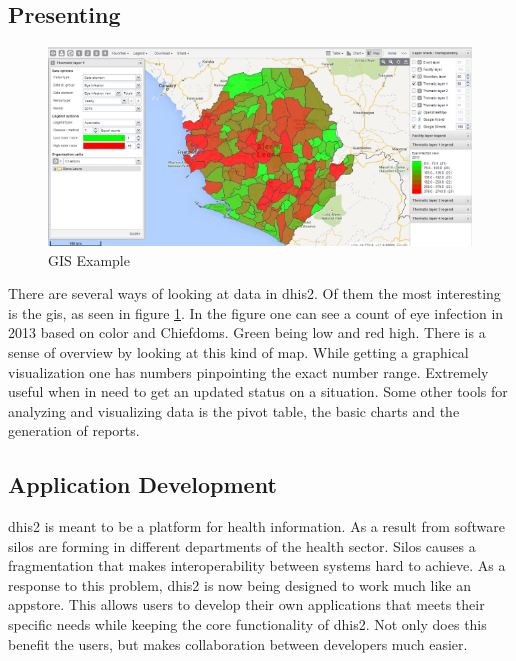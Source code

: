 \subsection{Presenting}
\begin{figure}
\centering
\includegraphics[width=\columnwidth]{context/img/gisExample}
\caption{GIS Example}
\label{fig:gis}
\end{figure}
There are several ways of looking at data in \gls{dhis2}. 
Of them the most interesting is the \gls{gis}, as seen in figure \ref{fig:gis}. 
In the figure one can see a count of eye infection in 2013 based on color and Chiefdoms. 
Green being low and red high. 
There is a sense of overview by looking at this kind of map. 
While getting a graphical visualization one has numbers pinpointing the exact number range. 
Extremely useful when in need to get an updated status on a situation. 
Some other tools for analyzing and visualizing data is the pivot table, the basic charts and the generation of reports.

\subsection{Application Development}
\gls{dhis2} is meant to be a platform for health information. 
As a result from software silos are forming in different departments of the health sector. 
Silos causes a fragmentation that makes interoperability between systems hard to achieve. 
As a response to this problem, \gls{dhis2} is now being designed to work much like an appstore. 
This allows users to develop their own applications that meets their specific needs while keeping the core functionality of \gls{dhis2}. 
Not only does this benefit the users, but makes collaboration between developers much easier. 


